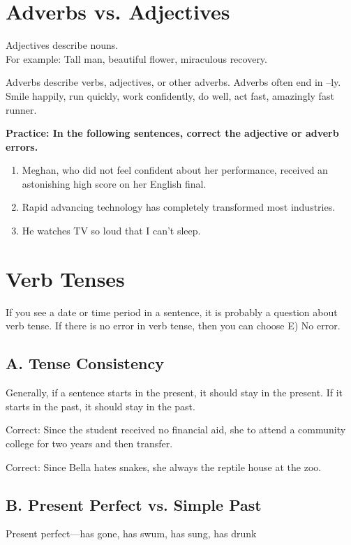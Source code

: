 \section{Adverbs vs. Adjectives}
Adjectives describe nouns.\\
For example: Tall man, beautiful flower, miraculous recovery.  

\bigskip
Adverbs describe verbs, adjectives, or other adverbs.  Adverbs often end in –ly.\\
Smile happily, run quickly, work confidently, do well, act fast, amazingly fast runner.

\bigskip
\textbf{Practice: In the following sentences, correct the adjective or adverb errors.}
\begin{enumerate}
\item{Meghan, who did not feel confident about her performance, received an astonishing high score on her English final.}
\item{Rapid advancing technology has completely transformed most industries.}
\item{He watches TV so loud that I can't sleep.}
\end{enumerate}

\section{Verb Tenses}
If you see a date or time period in a sentence, it is probably a question about verb tense.  If there is no error in verb tense, then you can choose E) No error.

\bigskip
\subsection{A. Tense Consistency}
Generally, if a sentence starts in the present, it should stay in the present.  If it starts in the past, it should stay in the past.

\bigskip
Correct:  Since the student received no financial aid, she \longline to attend a community college for two years and then transfer.

\bigskip
Correct:  Since Bella hates snakes, she always \longline the reptile house at the zoo.

\subsection{B. Present Perfect vs. Simple Past}
Present perfect—has gone, has swum, has sung, has drunk


